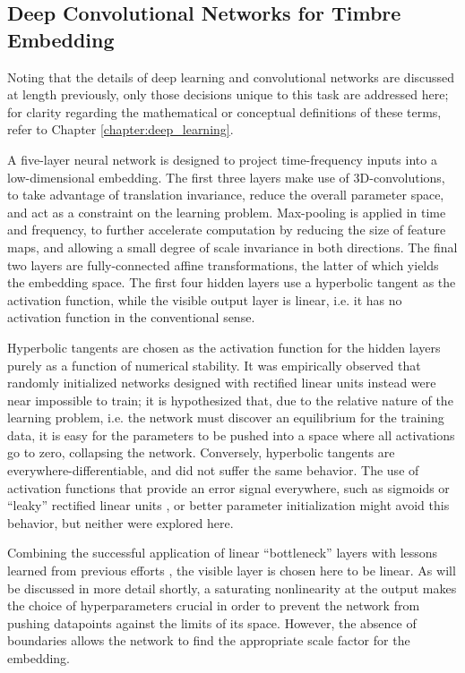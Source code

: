 \subsection{Deep Convolutional Networks for Timbre Embedding}
\label{subsec:timbre_deepnet}

Noting that the details of deep learning and convolutional networks are discussed at length previously, only those decisions unique to this task are addressed here; for clarity regarding the mathematical or conceptual definitions of these terms, refer to Chapter \ref{chapter:deep_learning}.

A five-layer neural network is designed to project time-frequency inputs into a low-dimensional embedding.
The first three layers make use of 3D-convolutions, to take advantage of translation invariance, reduce the overall parameter space, and act as a constraint on the learning problem.
Max-pooling is applied in time and frequency, to further accelerate computation by reducing the size of feature maps, and allowing a small degree of scale invariance in both directions.
The final two layers are fully-connected affine transformations, the latter of which yields the embedding space.
The first four hidden layers use a hyperbolic tangent as the activation function, while the visible output layer is linear, i.e. it has no activation function in the conventional sense.

Hyperbolic tangents are chosen as the activation function for the hidden layers purely as a function of numerical stability.
It was empirically observed that randomly initialized networks designed with rectified linear units instead were near impossible to train; it is hypothesized that, due to the relative nature of the learning problem, i.e. the network must discover an equilibrium for the training data, it is easy for the parameters to be pushed into a space where all activations go to zero, collapsing the network.
Conversely, hyperbolic tangents are everywhere-differentiable, and did not suffer the same behavior.
The use of activation functions that provide an error signal everywhere, such as sigmoids or ``leaky'' rectified linear units \cite{Maas2014}, or better parameter initialization might avoid this behavior, but neither were explored here.

Combining the successful application of linear ``bottleneck'' layers \cite{Liao2013} with lessons learned from previous efforts \cite{Humphrey2011}, the visible layer is chosen here to be linear.
As will be discussed in more detail shortly, a saturating nonlinearity at the output makes the choice of hyperparameters crucial in order to prevent the network from pushing datapoints against the limits of its space.
However, the absence of boundaries allows the network to find the appropriate scale factor for the embedding.


